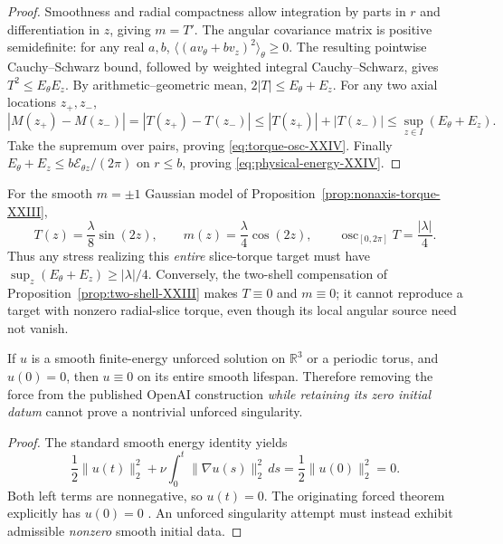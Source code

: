 \begin{proof}
Smoothness and radial compactness allow integration by parts in
$r$ and differentiation in $z$, giving $m=T'$.
The angular covariance matrix is positive semidefinite:
for any real $a,b$, $\langle(av_\theta+bv_z)^2\rangle_\theta\ge0$.
The resulting pointwise Cauchy--Schwarz bound, followed by weighted
integral Cauchy--Schwarz, gives $T^2\le E_\theta E_z$.
By arithmetic--geometric mean,
$2|T|\le E_\theta+E_z$.
For any two axial locations $z_+,z_-$,
\[
|M(z_+)-M(z_-)|=|T(z_+)-T(z_-)|
 \le |T(z_+)|+|T(z_-)|
 \le \sup_{z\in I}(E_\theta+E_z).
\]
Take the supremum over pairs, proving \eqref{eq:torque-osc-XXIV}.
Finally $E_\theta+E_z\le
b\mathcal E_{\theta z}/(2\pi)$ on $r\le b$, proving
\eqref{eq:physical-energy-XXIV}.
\end{proof}

\begin{corollary}
\label{cor:Gaussian-XXIV}
For the smooth $m=\pm1$ Gaussian model of
Proposition~\ref{prop:nonaxis-torque-XXIII},
\[
T(z)=\frac{\lambda}{8}\sin(2z),\qquad
m(z)=\frac{\lambda}{4}\cos(2z),\qquad
\operatorname{osc}_{[0,2\pi]}T=\frac{|\lambda|}{4}.
\]
Thus any stress realizing this \emph{entire} slice-torque target
must have $\sup_z(E_\theta+E_z)\ge|\lambda|/4$.
Conversely, the two-shell compensation of
Proposition~\ref{prop:two-shell-XXIII} makes $T\equiv0$ and
$m\equiv0$; it cannot reproduce a target with nonzero radial-slice
torque, even though its local angular source need not vanish.
\end{corollary}

\begin{proposition}
\label{prop:zero-data-XXIV}
If $u$ is a smooth finite-energy unforced solution on $\mathbb R^3$
or a periodic torus, and $u(0)=0$, then $u\equiv0$ on its entire
smooth lifespan. Therefore removing the force from the published
OpenAI construction \emph{while retaining its zero initial datum}
cannot prove a nontrivial unforced singularity.
\end{proposition}
\begin{proof}
The standard smooth energy identity yields
\[
\frac12\|u(t)\|_2^2+
\nu\int_0^t\|\nabla u(s)\|_2^2\,ds
=\frac12\|u(0)\|_2^2=0.
\]
Both left terms are nonnegative, so $u(t)=0$.
The originating forced theorem explicitly has $u(0)=0$
\cite{openai2026}. An unforced singularity attempt must instead
exhibit admissible \emph{nonzero} smooth initial data.
\end{proof}

